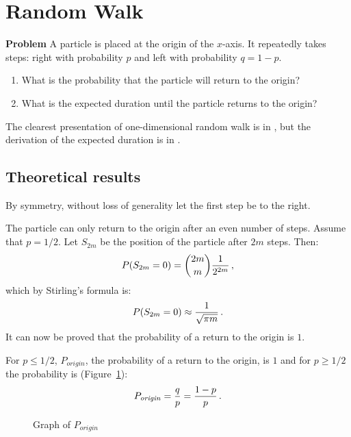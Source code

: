 
\section{Random Walk}\label{s.walk}

\textbf{Problem} A particle is placed at the origin of the $x$-axis. It repeatedly takes steps: right with probability $p$ and left with probability $q=1-p$.
\begin{enumerate}
\item What is the probability that the particle will return to the origin?
\item What is the expected duration until the particle returns to the origin?
\end{enumerate}
\begin{center}
\end{center}
The clearest presentation of one-dimensional random walk is in \cite{border}, but the derivation of the expected duration is in \cite{privault}.

\subsection{Theoretical results}

By symmetry, without loss of generality let the first step be to the right. 

The particle can only return to the origin after an even number of steps. Assume that $p=1/2$. Let $S_{2m}$ be the position of the particle after $2m$ steps. Then:
\[
P(S_{2m}=0) = \displaystyle{2m \choose m}\displaystyle\frac{1}{2^{2m}}\,,
\]
which by Stirling's formula is:
\[
P(S_{2m}=0) \approx \displaystyle\frac{1}{\sqrt{\pi m}}\,.
\]
It can now be proved that the probability of a return to the origin is $1$.

For $p\leq 1/2$, $P_{\mathit{origin}}$, the probability of a return to the origin, is $1$ and for $p\geq 1/2$ the probability is (Figure~\ref{f.walk1}):
\[
P_{\mathit{origin}} = \displaystyle\frac{q}{p}=\displaystyle\frac{1-p}{p}\,.
\]
\begin{figure}
\begin{center}
\caption{Graph of $P_{\mathit{origin}}$}\label{f.walk1}
\end{center}
\end{figure}

